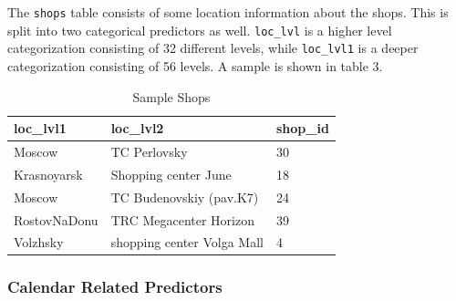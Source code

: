 \documentclass[floatsintext,man]{apa6}
\theoremstyle{definition}
\theoremstyle{definition}
\theoremstyle{definition}
\theoremstyle{remark}
\begin{document}
\begin{table}[H]

\caption{\label{tab:unnamed-chunk-2}Sample Item Categories}
\centering
{}
\end{table}

The \texttt{shops} table consists of some location information about the
shops. This is split into two categorical predictors as well.
\texttt{loc\_lvl} is a higher level categorization consisting of 32
different levels, while \texttt{loc\_lvl1} is a deeper categorization
consisting of 56 levels. A sample is shown in table 3.

\begin{table}[H]

\caption{\label{tab:unnamed-chunk-3}Sample Shops}
\centering
\fontsize{11}{13}\selectfont
\begin{tabular}[t]{lll}
\toprule
loc\_lvl1 & loc\_lvl2 & shop\_id\\
\midrule
Moscow & TC Perlovsky & 30\\
Krasnoyarsk & Shopping center June & 18\\
Moscow & TC Budenovskiy (pav.K7) & 24\\
RostovNaDonu & TRC Megacenter Horizon & 39\\
Volzhsky & shopping center Volga Mall & 4\\
\bottomrule
\end{tabular}
\end{table}

\subsubsection{Calendar Related
Predictors}\label{calendar-related-predictors}
\end{document}
